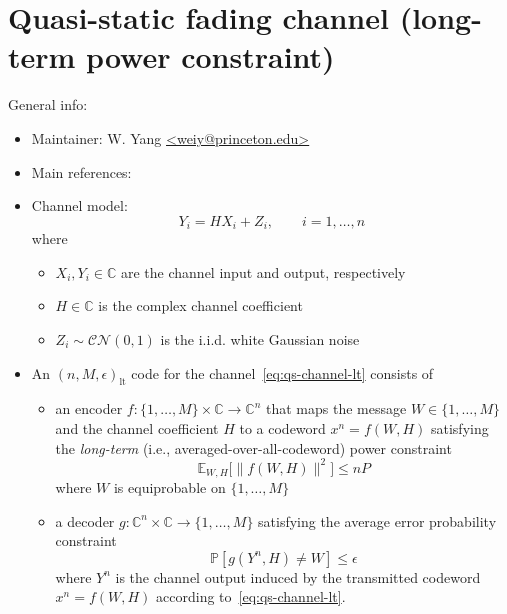 \documentclass[a4paper,11p]{memoir}
\def\complexset{\mathbb{C}}
\begin{document}
\chapter{Quasi-static fading channel (long-term power constraint) }

General info:
\begin{itemize}
\item Maintainer: W. Yang \url{<weiy@princeton.edu>}

\item Main references: \cite{yang15-09}


\item Channel model:
\begin{equation}
Y_i = H X_i + Z_i, \qquad i=1,\ldots, n
\label{eq:qs-channel-lt}
\end{equation}
where 
\begin{itemize}
%
\item $X_i, Y_i \in \complexset$ are the channel input and output, respectively
%
\item $H\in \complexset$ is the complex channel coefficient 
%
\item $ Z_i \sim \mathcal{CN}(0,1)$ is the i.i.d. white Gaussian noise
\end{itemize}
%
%
\item An $(n,M,\epsilon)_{\mathrm{lt}}$ code for the channel~\eqref{eq:qs-channel-lt} consists of 
%
\begin{itemize}
\item an encoder $f:\{1,\ldots,M\} \times \complexset \to \complexset^n $ that maps the message $W\in\{1,\ldots,M\}$ and the channel coefficient $H$ to a codeword $x^n = f(W,H)$ satisfying the \emph{long-term}  (i.e., averaged-over-all-codeword) power constraint 
\begin{equation}
\mathbb{E}_{W,H}\mathopen{}\big[\|f(W,H)\|^2\big] \leq n P
\end{equation}
where $W$ is equiprobable on $\{1,\ldots,M\}$ 
%
\item a decoder $g: \complexset^n \times \complexset \to\{1,\ldots,M\}$ satisfying the average error probability constraint 
\begin{equation}
\mathbb{P}[g(Y^n , H) \neq W] \leq \epsilon
\end{equation}
where $Y^n$ is the channel output induced by the transmitted codeword $x^n = f(W,H)$ according to~\eqref{eq:qs-channel-lt}.
 \end{itemize}


\end{itemize}
\end{document}
